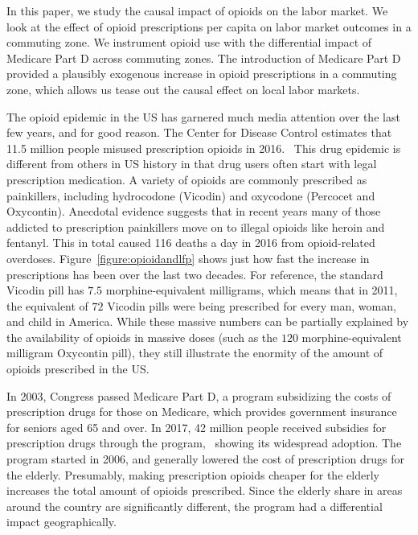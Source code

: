 \documentclass[12pt]{article}
\begin{document}
In this paper, we study the causal impact of opioids on the labor market.  We look at the effect of opioid prescriptions per capita on labor market outcomes in a commuting zone.  We instrument opioid use with the differential impact of Medicare Part D across commuting zones.  The introduction of Medicare Part D provided a plausibly exogenous increase in opioid prescriptions in a commuting zone, which allows us tease out the causal effect on local labor markets.

The opioid epidemic in the US has garnered much media attention over the last few years, and for good reason.  The Center for Disease Control estimates that 11.5 million people misused prescription opioids in 2016.~  This drug epidemic is different from others in US history in that drug users often start with legal prescription medication.  A variety of opioids are commonly prescribed as painkillers, including hydrocodone (Vicodin) and oxycodone (Percocet and Oxycontin).  Anecdotal evidence suggests that in recent years many of those addicted to prescription painkillers move on to illegal opioids like heroin and fentanyl.  This in total caused 116 deaths a day in 2016 from opioid-related overdoses.  Figure~\ref{figure:opioidandlfp} shows just how fast the increase in prescriptions has been over the last two decades.  For reference, the standard Vicodin pill has $7.5$ morphine-equivalent milligrams, which means that in 2011, the equivalent of $72$ Vicodin pills were being prescribed for every man, woman, and child in America.  While these massive numbers can be partially explained by the availability of opioids in massive doses (such as the $120$ morphine-equivalent milligram Oxycontin pill), they still illustrate the enormity of the amount of opioids prescribed in the US\@.

In 2003, Congress passed Medicare Part D, a program subsidizing the costs of prescription drugs for those on Medicare, which provides government insurance for seniors aged 65 and over.  In 2017, 42 million people received subsidies for prescription drugs through the program,~ showing its widespread adoption.  The program started in 2006, and generally lowered the cost of prescription drugs for the elderly.  Presumably, making prescription opioids cheaper for the elderly increases the total amount of opioids prescribed.  Since the elderly share in areas around the country are significantly different, the program had a differential impact geographically.  
\end{document}
